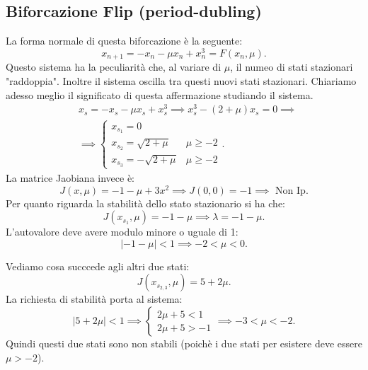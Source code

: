 \subsection{Biforcazione Flip (period-dubling)}%
La forma normale di questa biforcazione è la seguente:
\[
    x_{n+1}= -x_n - \mu x_n + x_n^3 = F(x_n, \mu) 
.\] 
Questo sistema ha la peculiarità che, al variare di $\mu$, il numeo di stati stazionari "raddoppia". Inoltre il sistema oscilla tra questi nuovi stati stazionari. Chiariamo adesso meglio il significato di questa affermazione studiando il sistema.
\[\begin{aligned}
    &x_s = - x_s - \mu x_s + x_s^3 \implies  x_s^3-(2 + \mu) x_s = 0\implies \\
    &\implies\begin{cases}
	x_{s_1} = 0 & \\
	x_{s_2}= \sqrt{2 + \mu} & \mu\ge -2\\
	x_{s_3}= -\sqrt{2 + \mu} & \mu  \ge -2
    \end{cases}
.\end{aligned}\]
La matrice Jaobiana invece è:
\[
    J(x, \mu) = -1 -\mu  + 3x^2 \implies  J(0 , 0) = -1 \implies  \text{ Non Ip.}
\] 
Per quanto riguarda la stabilità dello stato stazionario si ha che:
\[
    J(x_{s_1}, \mu) = -1-\mu\implies  \lambda  = -1-\mu
.\] 
L'autovalore deve avere modulo minore o uguale di 1:
\[
    \left|-1-\mu\right|<1 \implies  -2<\mu <0
.\] 

Vediamo cosa succcede agli altri due stati:
\[
    J(x_{s_{2, 3}}, \mu) = 5 + 2\mu
.\] 
La richiesta di stabilità porta al sistema:
\[
    \left|5 + 2\mu\right|< 1 \implies 
    \begin{cases}
        2\mu  + 5 < 1\\
	2\mu +5 > -1
    \end{cases}
    \implies 
    -3<\mu <-2
.\] 
Quindi questi due stati sono non stabili (poichè i due stati per esistere deve essere $\mu >-2$).
